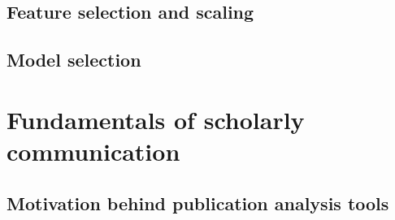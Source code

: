 \subsection{Feature selection and scaling}

\subsection{Model selection}
\section{Fundamentals of scholarly communication}
\subsection{Motivation behind publication analysis tools}
